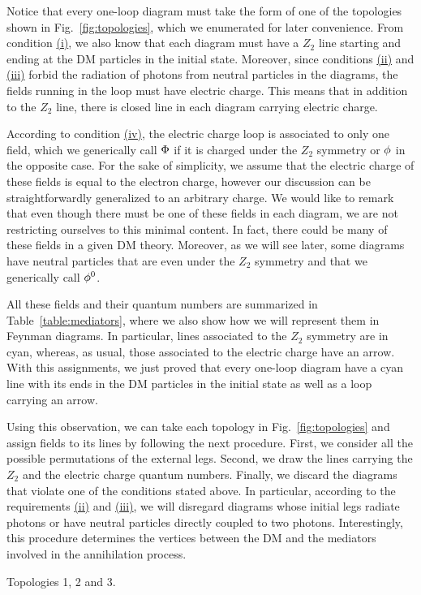 Notice that every one-loop diagram must take the form of one of the topologies shown in Fig.~\ref{fig:topologies}, which we enumerated for later convenience. From condition \hyperref[condition:i]{(i)}, we also know that each diagram must have  a $Z_2$ line starting and ending at the DM particles in the initial state. Moreover, since conditions \hyperref[condition:ii]{(ii)} and \hyperref[condition:iii]{(iii)} forbid the radiation of photons from neutral particles in the diagrams, the fields running in the loop must have electric charge. This means that in addition to the $Z_2$ line, there is closed line in each  diagram  carrying  electric charge.  

According to condition \hyperref[condition:iv]{(iv)}, the electric charge loop is associated to only one field, which we generically call ${\Phi}$ if it is charged under the $Z_2$ symmetry or ${\phi}$ in the opposite case. For the sake of simplicity, we assume that  the electric charge of these fields is equal to the  electron charge, however our discussion can be straightforwardly generalized to an arbitrary charge.  
We would like to remark that even though there must be one of these fields in each diagram, we are not restricting ourselves to this minimal content. In fact,   there could be many of these fields in a  given DM theory. Moreover, as we will see later, some diagrams have neutral particles that are even under the  $Z_2$ symmetry and that we generically call ${\phi^0}$.  

All these  fields and their quantum numbers are summarized in Table~\ref{table:mediators}, where we also show how we will represent them in Feynman diagrams. In particular, lines associated to the $Z_2$ symmetry are in cyan, whereas, as usual, those associated to the electric charge have an arrow. 
With this assignments, we just proved that every one-loop diagram have a cyan line with its ends in the DM particles in the initial state as well as a loop carrying an arrow. 

Using this observation, we can take each topology in Fig.~\ref{fig:topologies} and assign  fields to its lines by following the next procedure. First, we consider all the possible permutations of the external legs. Second, we draw the lines carrying the $Z_2$ and the electric charge %
quantum numbers. Finally, we discard the diagrams that violate one of the conditions stated above. In particular,  according to the requirements \hyperref[condition:ii]{(ii)} and \hyperref[condition:iii]{(iii)},  we will disregard diagrams whose initial legs radiate photons or have neutral particles directly  coupled to two photons.  Interestingly, this procedure %
determines the vertices  between the DM and the mediators involved in the annihilation process.  %
%

\begin{table}[H]
\usebox{\Ta}
\caption{Topologies 1, 2 and 3.}
\label{table:T123}
\end{table}

